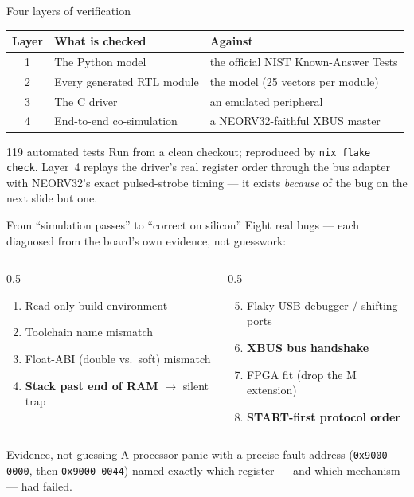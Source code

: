 \documentclass[aspectratio=169,11pt]{beamer}
\newcommand{\code}[1]{\texttt{\small #1}}
\begin{document}
\begin{frame}{Four layers of verification}
\small
\begin{center}
\begin{tabular}{cll}
\toprule
\textbf{Layer} & \textbf{What is checked} & \textbf{Against}\\
\midrule
1 & The Python model & the official NIST Known-Answer Tests\\
2 & Every generated RTL module & the model (25 vectors per module)\\
3 & The C driver & an emulated peripheral\\
4 & End-to-end co-simulation & a NEORV32-faithful XBUS master\\
\bottomrule
\end{tabular}
\end{center}
\vspace{3mm}
\begin{block}{119 automated tests}
\small Run from a clean checkout; reproduced by \code{nix flake check}. Layer~4
replays the driver's real register order through the bus adapter with NEORV32's
exact pulsed-strobe timing --- it exists \emph{because} of the bug on the next
slide but one.
\end{block}
\end{frame}

\begin{frame}{From ``simulation passes'' to ``correct on silicon''}
\small Eight real bugs --- each diagnosed from the board's own evidence, not guesswork:
\begin{columns}[T]
\begin{column}{0.5\textwidth}
\begin{enumerate}
\item Read-only build environment
\item Toolchain name mismatch
\item Float-ABI (double vs.\ soft) mismatch
\item \textbf{Stack past end of RAM} $\to$ silent trap
\end{enumerate}
\end{column}
\begin{column}{0.5\textwidth}
\begin{enumerate}\setcounter{enumi}{4}
\item Flaky USB debugger / shifting ports
\item \alert{\textbf{XBUS bus handshake}}
\item FPGA fit (drop the M extension)
\item \alert{\textbf{START-first protocol order}}
\end{enumerate}
\end{column}
\end{columns}
\vspace{2mm}
\begin{block}{Evidence, not guessing}
\small A processor panic with a precise fault address (\code{0x9000\,0000}, then
\code{0x9000\,0044}) named exactly which register --- and which mechanism --- had
failed.
\end{block}
\end{frame}
\end{document}
